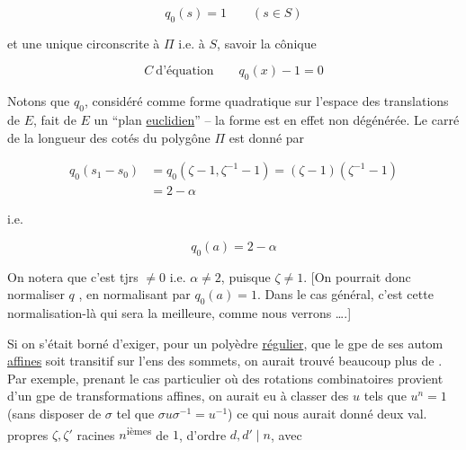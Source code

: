 \[q_{0}(s)=1\qquad(s\in S)\]


et une unique   circonscrite à $\Pi$ i.e. à $S$, savoir la cônique

\[C\ \text{d'équation}\qquad q_{0}(x)-1=0\]

Notons que $q_0$, considéré comme forme quadratique sur l'espace des translations de $E$, fait de $E$ un ``plan \uline{euclidien}'' -- la forme est en effet non dégénérée. Le carré de la longueur des cotés du polygône $\Pi$ est donné par

\[\begin{aligned}
q_0(s_1-s_0)&=q_0(\zeta-1,\zeta^{-1}-1)=(\zeta-1)(\zeta^{-1}-1)\\
&=2-\alpha
\end{aligned}\]

i.e.

\[q_0(a)=2-\alpha\]

On notera que c'est tjrs $\ne0$ i.e.  $\alpha\ne2$, puisque $\zeta\ne1$. [On pourrait donc normaliser  $q$ , en normalisant par $q_0(a)=1$. Dans le cas général, c'est cette normalisation-là qui sera la meilleure, comme nous verrons \dots.]




\uline{}

Si on s'était borné d'exiger, pour un polyèdre  \uline{régulier}, que le gpe de ses autom \uline{affines} soit transitif sur l'ens des sommets,  on aurait trouvé beaucoup plus de . Par exemple, prenant le cas particulier où  des rotations combinatoires provient d'un gpe de transformations affines, on aurait eu à classer des $u$ tels que $u^n=1$ (sans disposer de $\sigma$ tel que $\sigma u\sigma^{-1}=u^{-1}$) ce qui nous aurait donné deux val. propres $\zeta,\zeta'$ racines  $n$\textsuperscript{ièmes} de $1$, d'ordre $d,d'\mid n$, avec

